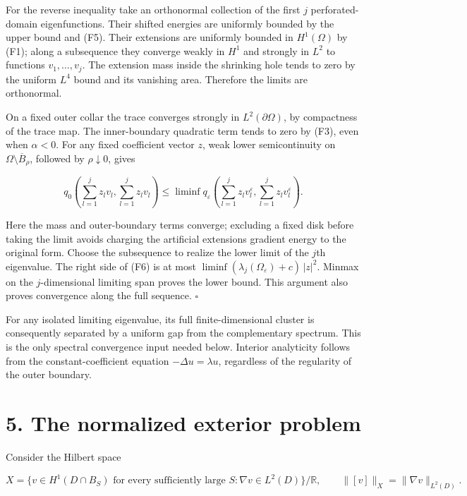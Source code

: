 \documentclass[11pt]{article}
\begin{document}
For the reverse inequality take an orthonormal collection of the first
\(j\) perforated-domain eigenfunctions. Their shifted energies are
uniformly bounded by the upper bound and (F5). Their extensions are
uniformly bounded in \(H^1(\Omega)\) by (F1); along a subsequence they
converge weakly in \(H^1\) and strongly in \(L^2\) to functions
\(v_1,\ldots,v_j\). The extension mass inside the shrinking hole tends
to zero by the uniform \(L^4\) bound and its vanishing area. Therefore
the limits are orthonormal.

On a fixed outer collar the trace converges strongly in
\(L^2(\partial\Omega)\), by compactness of the trace map. The
inner-boundary quadratic term tends to zero by (F3), even when
\(\alpha<0\). For any fixed coefficient vector \(z\), weak lower
semicontinuity on \(\Omega\setminus\overline B_\rho\), followed by
\(\rho\downarrow0\), gives

\[
 q_0\left(\sum_{l=1}^jz_lv_l,\sum_{l=1}^jz_lv_l\right)
 \le\liminf q_\varepsilon\left(\sum_{l=1}^jz_lv_l^\varepsilon,
                                    \sum_{l=1}^jz_lv_l^\varepsilon\right).
 \tag{F6}
\]

Here the mass and outer-boundary terms converge; excluding a fixed disk
before taking the limit avoids charging the artificial
extension\textquotesingle s gradient energy to the original form. Choose
the subsequence to realize the lower limit of the \(j\)th eigenvalue.
The right side of (F6) is at most
\(\liminf(\lambda_j(\Omega_\varepsilon)+c)\,|z|^2\). Minmax on the
\(j\)-dimensional limiting span proves the lower bound. This argument
also proves convergence along the full sequence. \(\square\)

For any isolated limiting eigenvalue, its full finite-dimensional
cluster is consequently separated by a uniform gap from the
complementary spectrum. This is the only spectral convergence input
needed below. Interior analyticity follows from the constant-coefficient
equation \(-\Delta u=\lambda u\), regardless of the regularity of the
outer boundary.

\section{5. The normalized exterior
problem}\label{the-normalized-exterior-problem}

Consider the Hilbert space

\[
 X=\{v\in H^1(D\cap B_S)\text{ for every sufficiently large }S:
       \nabla v\in L^2(D)\}/\mathbb R,
 \qquad \|[v]\|_X=\|\nabla v\|_{L^2(D)}.
\]
\end{document}
